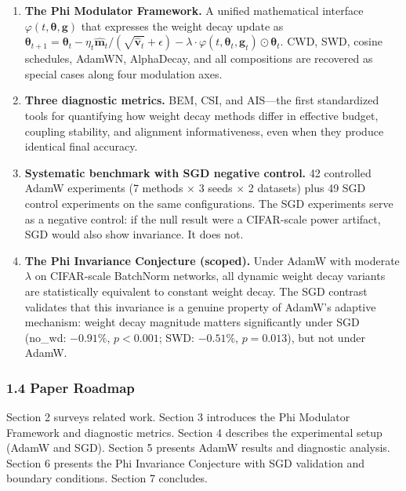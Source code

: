 \documentclass[
]{article}
\begin{document}
\begin{enumerate}
\def\labelenumi{\arabic{enumi}.}
\item
  \textbf{The Phi Modulator Framework.} A unified mathematical interface
  \(\varphi(t, \boldsymbol{\theta}, \mathbf{g})\) that expresses the
  weight decay update as
  \(\boldsymbol{\theta}_{t+1} = \boldsymbol{\theta}_t - \eta_t \hat{\mathbf{m}}_t / (\sqrt{\hat{\mathbf{v}}_t} + \epsilon) - \lambda \cdot \varphi(t, \boldsymbol{\theta}_t, \mathbf{g}_t) \odot \boldsymbol{\theta}_t\).
  CWD, SWD, cosine schedules, AdamWN, AlphaDecay, and all compositions
  are recovered as special cases along four modulation axes.
\item
  \textbf{Three diagnostic metrics.} BEM, CSI, and AIS---the first
  standardized tools for quantifying how weight decay methods differ in
  effective budget, coupling stability, and alignment informativeness,
  even when they produce identical final accuracy.
\item
  \textbf{Systematic benchmark with SGD negative control.} 42 controlled
  AdamW experiments (7 methods \(\times\) 3 seeds \(\times\) 2 datasets)
  plus 49 SGD control experiments on the same configurations. The SGD
  experiments serve as a negative control: if the null result were a
  CIFAR-scale power artifact, SGD would also show invariance. It does
  not.
\item
  \textbf{The Phi Invariance Conjecture (scoped).} Under AdamW with
  moderate \(\lambda\) on CIFAR-scale BatchNorm networks, all dynamic
  weight decay variants are statistically equivalent to constant weight
  decay. The SGD contrast validates that this invariance is a genuine
  property of AdamW's adaptive mechanism: weight decay magnitude matters
  significantly under SGD (no\_wd: \(-0.91\%\), \(p < 0.001\); SWD:
  \(-0.51\%\), \(p = 0.013\)), but not under AdamW.
\end{enumerate}

\hypertarget{paper-roadmap}{%
\subsubsection{1.4 Paper Roadmap}\label{paper-roadmap}}

Section 2 surveys related work. Section 3 introduces the Phi Modulator
Framework and diagnostic metrics. Section 4 describes the experimental
setup (AdamW and SGD). Section 5 presents AdamW results and diagnostic
analysis. Section 6 presents the Phi Invariance Conjecture with SGD
validation and boundary conditions. Section 7 concludes.
\end{document}
